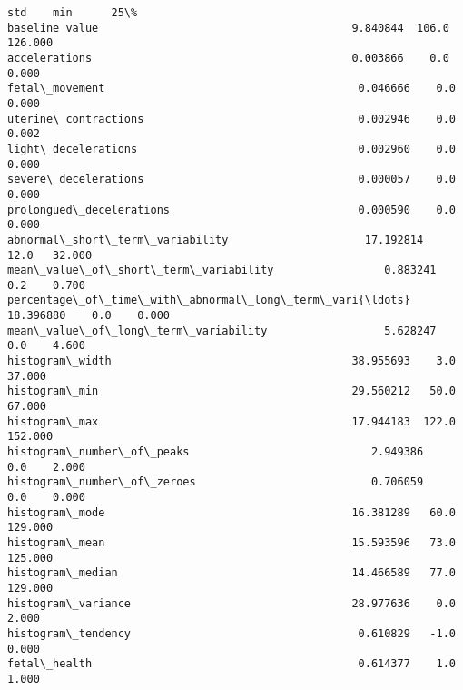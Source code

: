 \documentclass[11pt]{article}
\begin{document}
\begin{tcolorbox}[breakable, size=fbox, boxrule=.5pt, pad at break*=1mm, opacityfill=0]
\begin{Verbatim}[commandchars=\\\{\}]
                                                          std    min      25\%  
baseline value                                       9.840844  106.0  126.000
accelerations                                        0.003866    0.0    0.000
fetal\_movement                                       0.046666    0.0    0.000
uterine\_contractions                                 0.002946    0.0    0.002
light\_decelerations                                  0.002960    0.0    0.000
severe\_decelerations                                 0.000057    0.0    0.000
prolongued\_decelerations                             0.000590    0.0    0.000
abnormal\_short\_term\_variability                     17.192814   12.0   32.000
mean\_value\_of\_short\_term\_variability                 0.883241    0.2    0.700
percentage\_of\_time\_with\_abnormal\_long\_term\_vari{\ldots}  18.396880    0.0    0.000
mean\_value\_of\_long\_term\_variability                  5.628247    0.0    4.600
histogram\_width                                     38.955693    3.0   37.000
histogram\_min                                       29.560212   50.0   67.000
histogram\_max                                       17.944183  122.0  152.000
histogram\_number\_of\_peaks                            2.949386    0.0    2.000
histogram\_number\_of\_zeroes                           0.706059    0.0    0.000
histogram\_mode                                      16.381289   60.0  129.000
histogram\_mean                                      15.593596   73.0  125.000
histogram\_median                                    14.466589   77.0  129.000
histogram\_variance                                  28.977636    0.0    2.000
histogram\_tendency                                   0.610829   -1.0    0.000
fetal\_health                                         0.614377    1.0    1.000


\end{Verbatim}
\end{tcolorbox}
\end{document}
